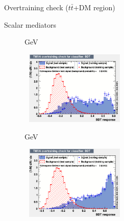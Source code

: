 \documentclass[8pt]{beamer}
\begin{document}
\begin{frame}{Overtraining check ($t \bar t$+DM region)}
\justifying
\begin{block}{\centering Scalar mediators}\end{block} \vspace{-10pt}
\begin{figure}[htbp]
\centering
\begin{minipage}[b]{.49\textwidth}
\vspace{-5pt}
\begin{block}{ GeV}\end{block}
\begin{center}
\includegraphics[width=5.2cm, height=3.5cm]{figs/overtraining_scalar100_TTbar.png}
\end{center}
\end{minipage}
\begin{minipage}[b]{.02\textwidth}\end{minipage}
\begin{minipage}[b]{.49\textwidth}
\vspace{-5pt}
\begin{block}{ GeV}\end{block}
\begin{center}
\includegraphics[width=5.2cm, height=3.5cm]{figs/overtraining_scalar500_TTbar.png}
\end{center}
\end{minipage}
\end{figure} \vfill


\end{frame}
\end{document}
